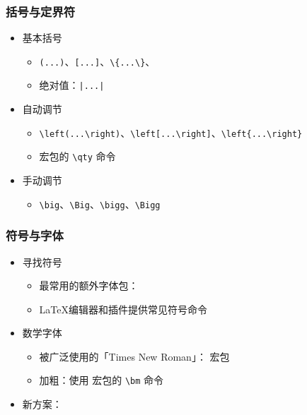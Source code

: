 \begin{frame}[fragile]
    \frametitle{括号与定界符}
    \begin{itemize}
        \item<+-> 基本括号
            \begin{itemize}
                \item \verb|(...)|、\verb|[...]|、\verb|\{...\}|、
                \item 绝对值：\lstinline+|...|+
            \end{itemize}
        \item<+-> 自动调节
            \begin{itemize}
                \item \verb|\left(...\right)|、\verb|\left[...\right]|、\verb|\left{...\right}|
                \item {}宏包的 \verb|\qty| 命令
            \end{itemize}
        \item<+-> 手动调节
            \begin{itemize}
                \item \verb|\big|、\verb|\Big|、\verb|\bigg|、\verb|\Bigg|
            \end{itemize}
    \end{itemize}
\end{frame}

\begin{frame}[fragile]
    \frametitle{符号与字体}
    \begin{itemize}
        \item 寻找符号
              \begin{itemize}
                  \item 最常用的额外字体包：
                  \item \LaTeX{}编辑器和插件提供常见符号命令
              \end{itemize}
        \item 数学字体
              \begin{itemize}
                  \item 被广泛使用的「Times New Roman」： 宏包
                  \item 加粗：使用  宏包的 \verb|\bm| 命令
              \end{itemize}
        \item 新方案：
    \end{itemize}
\end{frame}

